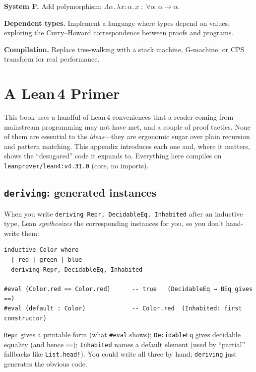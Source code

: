 \documentclass[11pt,a4paper]{article}
\theoremstyle{definition}
\newcommand{\lam}{\lambda}
\newcommand{\Lam}{\Lambda}
\begin{document}
\textbf{System F.} Add polymorphism: $\Lam\alpha.\, \lam x{:}\alpha.\, x
\;:\; \forall\alpha.\, \alpha \to \alpha$.

\textbf{Dependent types.} Implement a language where types depend on values,
exploring the Curry--Howard correspondence between proofs and programs.

\textbf{Compilation.} Replace tree-walking with a stack machine, G-machine, or
CPS transform for real performance.

\newpage
\appendix
\section{A Lean\,4 Primer}\label{app:primer}

This book uses a handful of Lean\,4 conveniences that a reader coming from
mainstream programming may not have met, and a couple of proof tactics. None of
them are essential to the \emph{ideas}---they are ergonomic sugar over plain
recursion and pattern matching. This appendix introduces each one and, where it
matters, shows the ``desugared'' code it expands to. Everything here compiles on
\texttt{leanprover/lean4:v4.31.0} (core, no imports).

\subsection*{\texttt{deriving}: generated instances}

When you write \texttt{deriving Repr, DecidableEq, Inhabited} after an inductive
type, Lean \emph{synthesizes} the corresponding instances for you, so you don't
hand-write them:

\begin{verbatim}
inductive Color where
  | red | green | blue
  deriving Repr, DecidableEq, Inhabited

#eval (Color.red == Color.red)      -- true   (DecidableEq → BEq gives ==)
#eval (default : Color)             -- Color.red  (Inhabited: first constructor)
\end{verbatim}

\texttt{Repr} gives a printable form (what \texttt{\#eval} shows);
\texttt{DecidableEq} gives decidable equality (and hence \texttt{==});
\texttt{Inhabited} names a default element (used by ``partial'' fallbacks like
\texttt{List.head!}). You could write all three by hand; \texttt{deriving} just
generates the obvious code.
\end{document}
